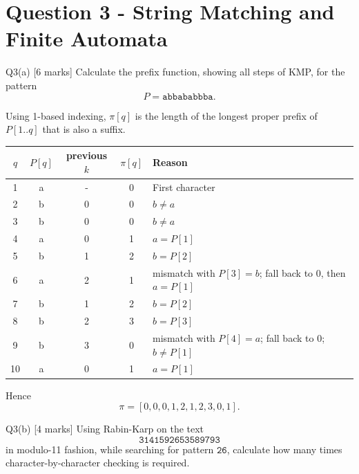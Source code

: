 \documentclass[10.5pt,a4paper]{article}
\begin{document}
\section{Question 3 - String Matching and Finite Automata}

\begin{questionbox}{Q3(a) [6 marks]}
Calculate the prefix function, showing all steps of KMP, for the pattern
\[
P=\texttt{abbababbba}.
\]
\end{questionbox}

\begin{answerbox}
Using 1-based indexing, \(\pi[q]\) is the length of the longest proper prefix of \(P[1..q]\) that is also a suffix.

\begin{center}
\small
\begin{tabular}{c c c c p{6.2cm}}
\toprule
\(q\) & \(P[q]\) & previous \(k\) & \(\pi[q]\) & Reason\\
\midrule
1 & a & - & 0 & First character\\
2 & b & 0 & 0 & \(b\neq a\)\\
3 & b & 0 & 0 & \(b\neq a\)\\
4 & a & 0 & 1 & \(a=P[1]\)\\
5 & b & 1 & 2 & \(b=P[2]\)\\
6 & a & 2 & 1 & mismatch with \(P[3]=b\); fall back to 0, then \(a=P[1]\)\\
7 & b & 1 & 2 & \(b=P[2]\)\\
8 & b & 2 & 3 & \(b=P[3]\)\\
9 & b & 3 & 0 & mismatch with \(P[4]=a\); fall back to 0; \(b\neq P[1]\)\\
10& a & 0 & 1 & \(a=P[1]\)\\
\bottomrule
\end{tabular}
\end{center}

Hence
\[
\boxed{\pi=[0,0,0,1,2,1,2,3,0,1]}.
\]
\end{answerbox}

\begin{questionbox}{Q3(b) [4 marks]}
Using Rabin-Karp on the text
\[
\texttt{3141592653589793}
\]
in modulo-11 fashion, while searching for pattern \(\texttt{26}\), calculate how many times character-by-character checking is required.
\end{questionbox}
\end{document}
